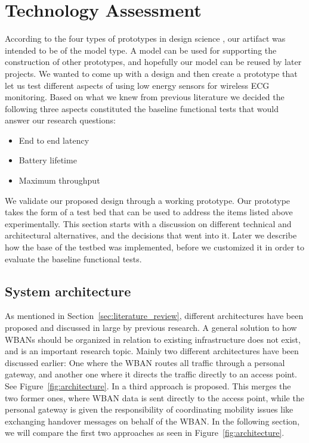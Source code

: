 \section{Technology Assessment} %
\label{sec:technology_assessment}

According to the four types of prototypes in design science \cite{Johannesson:2014co}, our artifact was intended to be of the model type. A model can be used for supporting the construction of other prototypes, and hopefully our model can be reused by later projects. We wanted to come up with a design and then create a prototype that let us test different aspects of using low energy sensors for wireless ECG monitoring. Based on what we knew from previous literature we decided the following three aspects constituted the baseline functional tests that would answer our research questions:
\begin{itemize}
	
	\item End to end latency
	\item Battery lifetime
	\item Maximum throughput
  
\end{itemize}
\noindent
We validate our proposed design through a working prototype. Our prototype takes the form of a test bed that can be used to address the items listed above experimentally. This section starts with a discussion on different technical and architectural alternatives, and the decisions that went into it. Later we describe how the base of the testbed was implemented, before we customized it in order to evaluate the baseline functional tests.

\subsection{System architecture} %
\label{sub:system_architecture}

As mentioned in Section~\ref{sec:literature_review}, different architectures have been proposed and discussed in large by previous research. A general solution to how WBANs should be organized in relation to existing infrastructure does not exist, and is an important research topic. Mainly two different architectures have been discussed earlier: One where the WBAN routes all traffic through a personal gateway, and another one where it directs the traffic directly to an access point. See Figure~\ref{fig:architecture}. In \cite{Shahamabadi:2013df} a third approach is proposed. This merges the two former ones, where WBAN data is sent directly to the access point, while the personal gateway is given the responsibility of coordinating mobility issues like exchanging handover messages on behalf of the WBAN. In the following section, we will compare the first two approaches as seen in Figure~\ref{fig:architecture}.

